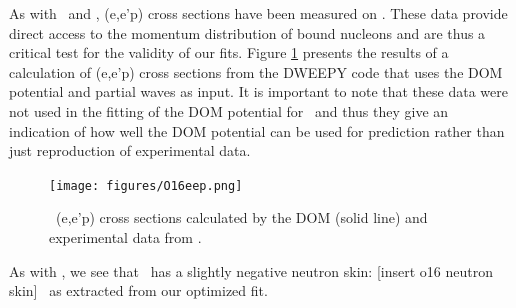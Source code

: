 As with \caForty\ and \pbEight, (e,e'p) cross sections have been measured on \oSix. These data
provide direct access to the momentum distribution of bound nucleons and are thus a critical test
for the validity of our fits. Figure \ref{O16eep} presents the results of a calculation of (e,e'p)
cross sections from the DWEEPY code \cite{Atkinson2018, Giusti2011} that uses the DOM potential and partial waves as input.
It is important to note that these data were not used in the fitting of the DOM
potential for \oSix\ and thus they give an indication of how well
the DOM potential can be used for prediction rather than just reproduction of experimental data.

\begin{figure}[tb]
    \centering
    \texttt{[image: figures/O16eep.png]}
    \caption[\oSix\ (e,e'p) cross sections calculated by the DOM]
    {
        \oSix\ (e,e'p) cross sections calculated by the DOM (solid line) and experimental data from
        \cite{Leuschner1994}.
    }
    \label{O16eep}
\end{figure}

As with \caForty, we see that \oSix\ has a slightly negative neutron skin: [insert o16 neutron skin]
\femto\meter\ as extracted from our optimized fit.

